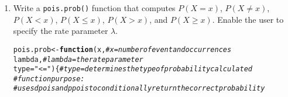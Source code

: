 \documentclass{article}\usepackage[]{graphicx}\usepackage[]{xcolor}
\makeatletter
\newcommand{\hlsng}[1]{\textcolor[rgb]{0.192,0.494,0.8}{#1}}%
\newcommand{\hlcom}[1]{\textcolor[rgb]{0.678,0.584,0.686}{\textit{#1}}}%
\newcommand{\hldef}[1]{\textcolor[rgb]{0.345,0.345,0.345}{#1}}%
\newcommand{\hlkwa}[1]{\textcolor[rgb]{0.161,0.373,0.58}{\textbf{#1}}}%
\newcommand{\hlkwb}[1]{\textcolor[rgb]{0.69,0.353,0.396}{#1}}%
\newcommand{\hlkwc}[1]{\textcolor[rgb]{0.333,0.667,0.333}{#1}}%
\newenvironment{kframe}{%
 \def\at@end@of@kframe{}%
 \ifinner\ifhmode%
  \def\at@end@of@kframe{\end{minipage}}%
  \begin{minipage}{\columnwidth}%
 \fi\fi%
 \def\FrameCommand##1{\hskip\@totalleftmargin \hskip-\fboxsep
 \colorbox{shadecolor}{##1}\hskip-\fboxsep
     \hskip-\linewidth \hskip-\@totalleftmargin \hskip\columnwidth}%
 \MakeFramed {\advance\hsize-\width
   \@totalleftmargin\z@ \linewidth\hsize
   \@setminipage}}%
 {\par\unskip\endMakeFramed%
 \at@end@of@kframe}
\newenvironment{knitrout}{}{} %
\makeatother
\begin{document}
  \begin{enumerate}
    \item Write a \texttt{pois.prob()} function that computes $P(X=x)$, 
    $P(X \neq x)$, $P(X<x)$, $P(X \leq x)$, $P(X > x)$, and $P(X \geq x).$ Enable the user to specify the rate parameter $\lambda$.
\begin{knitrout}\scriptsize
{}\color{fgcolor}\begin{kframe}
\begin{alltt}
\hldef{pois.prob} \hlkwb{<-} \hlkwa{function}\hldef{(}\hlkwc{x}\hldef{,}             \hlcom{#x = number of event and occurrences}
                      \hlkwc{lambda}\hldef{,}        \hlcom{#lambda = the rate parameter}
                      \hlkwc{type} \hldef{=} \hlsng{"<="}\hldef{) \{} \hlcom{#type = determines the type of probability calculated}
  \hlcom{#function purpose:}
  \hlcom{#uses dpois and ppois to conditionally return the correct probability}


\end{alltt}
\end{kframe}
\end{knitrout}
\end{enumerate}
\end{document}
